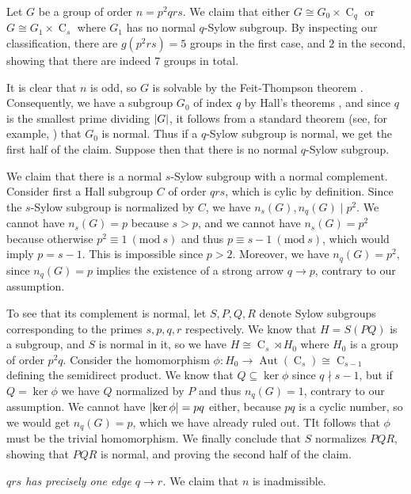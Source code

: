 \documentclass{article}
\DeclarePairedDelimiter\abs{\lvert}{\rvert}
\newcommand{\aut}[1]{\operatorname{Aut}(#1)}
\newcommand{\cyc}[1]{\operatorname{C}_{#1}}
\newcommand{\Mod}[1]{\ (\mathrm{mod} \ #1)}
\theoremstyle{plain}
\theoremstyle{definition}
\begin{document}
Let $G$ be a group of order $n = p^2 q r s$. We claim that either $G \cong G_0 \times \cyc{q}$ or $G \cong G_1\times \cyc{s}$ where $G_1$ has no normal $q$-Sylow subgroup. By inspecting our classification, there are $g(p^2 r s) = 5$ groups in the first case, and $2$ in the second, showing that there are indeed $7$ groups in total.

It is clear that $n$ is odd, so $G$ is solvable by the Feit-Thompson theorem {\cite{oddsolve}}. Consequently, we have a subgroup $G_0$ of index $q$ by Hall's theorems {\cite[Th.~3.13]{fgt}}, and since $q$ is the smallest prime dividing $\abs{G}$, it follows from a standard theorem (see, for example, {\cite{primnorm}}) that $G_0$ is normal. Thus if a $q$-Sylow subgroup is normal, we get the first half of the claim. Suppose then that there is no normal $q$-Sylow subgroup.

We claim that there is a normal $s$-Sylow subgroup with a normal complement. Consider first a Hall subgroup $C$ of order $qrs$, which is cylic by definition. Since the $s$-Sylow subgroup is normalized by $C$, we have $n_s(G), n_q(G) \mid p^2$. We cannot have $n_s(G) = p$ because $s > p$, and we cannot have $n_s(G) = p^2$ because otherwise $p^2 \equiv 1 \Mod{s}$ and thus $p \equiv s - 1 \Mod{s}$, which would imply $p = s - 1$. This is impossible since $p > 2$. Moreover, we have $n_q(G) = p^2$, since $n_q(G) = p$ implies the existence of a strong arrow $q \rightarrow p$, contrary to our assumption.

To see that its complement is normal, let $S, P, Q, R$ denote Sylow subgroups corresponding to the primes $s, p, q, r$ respectively. We know that $H = S(PQ)$ is a subgroup, and $S$ is normal in it, so we have $H \cong \cyc{s} \rtimes H_0$ where $H_0$ is a group of order $p^2 q$. Consider the homomorphism $\phi : H_0 \rightarrow \aut{\cyc{s}} \cong \cyc{s - 1}$ defining the semidirect product. We know that $Q \subseteq \ker \phi$ since $q \nmid s - 1$, but if $Q = \ker \phi$ we have $Q$ normalized by $P$ and thus $n_q(G) = 1$, contrary to our assumption. We cannot have $\abs{\ker \phi} = pq$ either, because $pq$ is a cyclic number, so we would get $n_q(G) = p$, which we have already ruled out. TIt follows that $\phi$ must be the trivial homomorphism. We finally conclude that $S$ normalizes $PQR$, showing that $PQR$ is normal, and proving the second half of the claim.

 \emph{$qrs$ has precisely one edge $q \rightarrow r$.} We claim that $n$ is inadmissible.\nopagebreak
\end{document}
